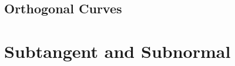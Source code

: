 \documentclass[11pt,a4paper,landscape]{article}
\begin{document}
\begin{multicols*}{2}
	\subsection{Orthogonal Curves}
\section{Subtangent and Subnormal}
\end{multicols*}
\end{document}

